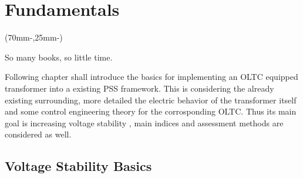 


\chapter{Fundamentals}
\label{chap:fundamentals}

\begin{textblock*}{.7\textwidth}(70mm-\offset,25mm-\offset)
    \begin{fquote}
        So many books, so little time.
    \end{fquote}
\end{textblock*}

Following chapter shall introduce the basics for implementing an \acs{OLTC} equipped transformer into a existing \acs{PSS} framework.
This is considering the already existing surrounding, more detailed the electric behavior of the transformer itself and some control engineering theory for the corrosponding \acs{OLTC}. 
Thus its main goal is increasing voltage stability \autocite{machowski_2020}, main indices and assessment methods are considered as well.

\section{Voltage Stability Basics}
\label{sec:voltage-stability}

